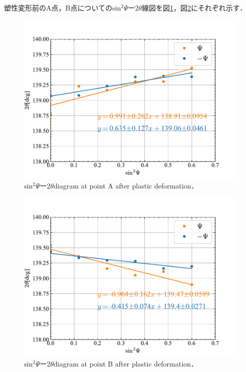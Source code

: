 塑性変形前のA点，B点についての$\mathrm{sin}^2\Psi$ー$2\theta$線図を図\ref{fig:fig_AfterRed}，図\ref{fig:fig_AfterBlack}にそれぞれ示す．
\begin{figure}[htbp]
    \centering %
    \includegraphics[width=100truemm,clip]{fig/fig_AfterRed.pdf}
    \caption{$\mathrm{sin}^2\Psi$ー$2\theta$diagram at point A after plastic deformation．}
    \label{fig:fig_AfterRed}
\end{figure}
\begin{figure}[htbp]
    \centering %
    \includegraphics[width=100truemm,clip]{fig/fig_AfterBlack.pdf}
    \caption{$\mathrm{sin}^2\Psi$ー$2\theta$diagram at point B after plastic deformation．}
    \label{fig:fig_AfterBlack}
\end{figure}


